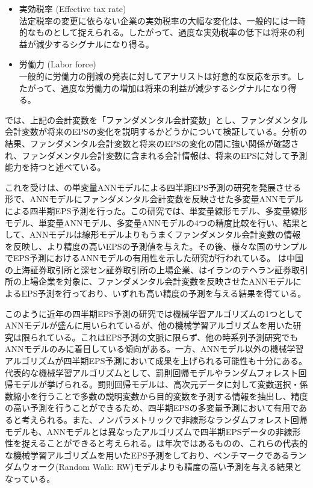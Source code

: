 \documentclass[a4paper, 12pt]{jsreport}
\begin{document}
\begin{itemize}
\item 実効税率 (Effective tax rate) \\
    法定税率の変更に依らない企業の実効税率の大幅な変化は、一般的には一時的なものとして捉えられる。したがって、過度な実効税率の低下は将来の利益が減少するシグナルになり得る。

\item 労働力 (Labor force) \\
    一般的に労働力の削減の発表に対してアナリストは好意的な反応を示す。したがって、過度な労働力の増加は将来の利益が減少するシグナルになり得る。
\end{itemize}

\cite*{abarbanell1997fundamental}では、上記の会計変数を「ファンダメンタル会計変数」とし、ファンダメンタル会計変数が将来のEPSの変化を説明するかどうかについて検証している。分析の結果、ファンダメンタル会計変数と将来のEPSの変化の間に強い関係が確認され、ファンダメンタル会計変数に含まれる会計情報は、将来のEPSに対して予測能力を持つと述べている。

これを受け\cite{zhang2004neural}は、\cite{callen1996neural}の単変量ANNモデルによる四半期EPS予測の研究を発展させる形で、ANNモデルにファンダメンタル会計変数を反映させた多変量ANNモデルによる四半期EPS予測を行った。この研究では、単変量線形モデル、多変量線形モデル、単変量ANNモデル、多変量ANNモデルの4つの精度比較を行い、結果として、ANNモデルは線形モデルよりもうまくファンダメンタル会計変数の情報を反映し、より精度の高いEPSの予測値を与えた。その後、様々な国のサンプルでEPS予測におけるANNモデルの有用性を示した研究が行われている。\cite*{cao2009forecasting} は中国の上海証券取引所と深セン証券取引所の上場企業、\cite{etemadi2015earnings}はイランのテヘラン証券取引所の上場企業を対象に、ファンダメンタル会計変数を反映させたANNモデルによるEPS予測を行っており、いずれも高い精度の予測を与える結果を得ている。

このように近年の四半期EPS予測の研究では機械学習アルゴリズムの1つとしてANNモデルが盛んに用いられているが、他の機械学習アルゴリズムを用いた研究は限られている。これはEPS予測の文脈に限らず、他の時系列予測研究でもANNモデルのみに着目している傾向がある\citep{ahmed2010empirical}。一方、ANNモデル以外の機械学習アルゴリズムが四半期EPS予測において成果を上げられる可能性も十分にある。代表的な機械学習アルゴリズムとして、罰則回帰モデルやランダムフォレスト回帰モデルが挙げられる\citep{hastie2009esl}。罰則回帰モデルは、高次元データに対して変数選択・係数縮小を行うことで多数の説明変数から目的変数を予測する情報を抽出し、精度の高い予測を行うことができるため、四半期EPSの多変量予測において有用であると考えられる。また、ノンパラメトリックで非線形なランダムフォレスト回帰モデル\citep{breiman2001random}も、ANNモデルとは異なったアルゴリズムで四半期EPSデータの非線形性を捉えることができると考えられる。\cite*{cao2020fundamental}は年次ではあるものの、これらの代表的な機械学習アルゴリズムを用いたEPS予測をしており、ベンチマークであるランダムウォーク(Random Walk: RW)モデルよりも精度の高い予測を与える結果となっている。
\end{document}
